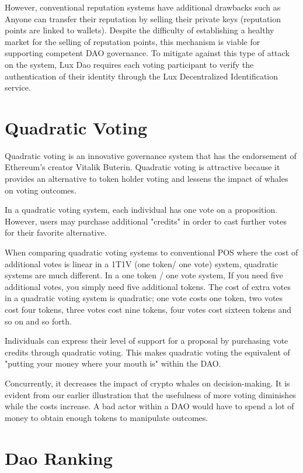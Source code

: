 \documentclass[11pt]{article}
\begin{document}
However, conventional reputation systems have additional drawbacks such as Anyone can transfer their reputation by selling their private keys (reputation points are linked to wallets). Despite the difficulty of establishing a healthy market for the selling of reputation points, this mechanism is viable for supporting competent DAO governance. To mitigate against this type of attack on the system, Lux Dao requires each voting participant to verify the authentication of their identity through the Lux Decentralized Identification service.


\section{Quadratic Voting}

Quadratic voting is an innovative governance system that has the endorsement of Ethereum's creator Vitalik Buterin. Quadratic voting is attractive because it provides an alternative to token holder voting and lessens the impact of whales on voting outcomes.


In a quadratic voting system, each individual has one vote on a proposition. However, users may purchase additional "credits" in order to cast further votes for their favorite alternative.


When comparing quadratic voting systems to conventional POS where the cost of additional votes is linear in a 1T1V (one token/ one vote) system, quadratic systems are much different. In a one token / one vote system, If you need five additional votes, you simply need five additional tokens. The cost of extra votes in a quadratic voting system is quadratic; one vote costs one token, two votes cost four tokens, three votes cost nine tokens, four votes cost sixteen tokens and so on and so forth.


Individuals can express their level of support for a proposal by purchasing vote credits through quadratic voting. This makes quadratic voting the equivalent of "putting your money where your mouth is" within the DAO.


Concurrently, it decreases the impact of crypto whales on decision-making. It is evident from our earlier illustration that the usefulness of more voting diminishes while the costs increase. A bad actor within a DAO would have to spend a lot of money to obtain enough tokens to manipulate outcomes.


\section{Dao Ranking}
\end{document}
